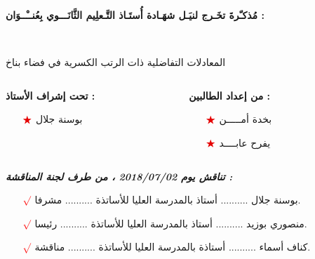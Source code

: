 \documentclass[dvipsnames,mathserif]{beamer}
\makeatletter
\newcommand{\leftm}{\@totalleftmargin}
\newcommand{\RTListe}{\raggedleft\rightskip\leftm}
\makeatother
\begin{document}
\begin{frame}[plain]{
\large 
\textbf{مُذكـّرةَ تخَـرج لنيَـل شهَـادة أُستَـاذ التَّـعلِيم الثَّانَـــوي
 بِعُنــْــوَان :}
}\transglitter[duration=0.5]

\begin{tcolorbox}[colback=white,drop large lifted shadow,top=.5cm,bottom=.5cm]
\begin{center}
\begin{LARGE}
\end{LARGE}\hfill\\
 \begin{Large}
المعادلات التفاضلية ذات الرتب الكسرية في فضاء بناخ
 \end{Large}
\end{center}
\end{tcolorbox}
\begin{small}
\begin{columns}
\begin{column}{0.5\linewidth}
{\textbf{
تحت إشراف الأستاذ :
}}
\begin{itemize}
\item[$\textcolor{red!90!black}{\bigstar}$]
بوسنة جلال
\end{itemize}
\end{column}
\begin{column}{0.3\linewidth}
{{\textbf{من إعداد الطالبين :}}}
\begin{itemize}
\item[$\textcolor{red!90!black}{\bigstar}$]
بخدة أمـــــن
~\item[$\textcolor{red!90!black}{\bigstar}$]
يفرح عابــــد
\end{itemize}
\end{column}
\end{columns}
\end{small}
\textbf{{{\emph{تناقش يوم 2018/07/02 ، من طرف لجنة المناقشة :}}}
}
\begin{small}
\begin{itemize}\RTListe
\item[$\textcolor{red}{\surd}$] 
 بوسنة جلال
 ..........
 أستاذ بالمدرسة العليا للأساتذة
 ..........
  مشرفا.
 
\item[$\textcolor{red}{\surd}$]
منصوري بوزيد
 ..........
 أستاذ بالمدرسة العليا للأساتذة
 ..........
 رئيسا.
\item[$\textcolor{red}{\surd}$]
كناف أسماء
 ..........
 أستاذة بالمدرسة العليا للأساتذة
 ..........
مناقشة.
\end{itemize}

\end{small}
\end{frame}
\end{document}
